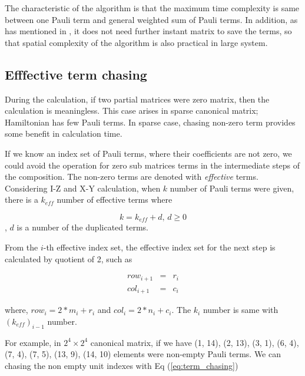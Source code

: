 \documentclass[twocolumn]{article}
\begin{document}
The characteristic of the algorithm is that 
the maximum time complexity is same between one Pauli term and general weighted sum of Pauli terms.
In addition, as has mentioned in \cite{Hantzko_2024}, it does not need further 
instant matrix to save the terms, so that spatial complexity of the algorithm is also practical 
in large system.

\subsection{Efffective term chasing}

During the calculation, if two partial matrices were zero matrix, then 
the calculation is meaningless. This case arises in sparse canonical matrix; 
Hamiltonian has few Pauli terms.
In sparse case, chasing non-zero term provides some benefit in calculation time.

If we know an index set of Pauli terms, where their coefficients are not zero,
we could avoid the operation for zero sub matrices terms in the intermediate steps of the composition.
The non-zero terms are denoted with \textit{effective} terms. 
Considering I-Z and X-Y calculation, when $k$ number of Pauli terms were given, 
there is a $k_{eff}$ number of effective terms where

\begin{equation}
    k = k_{eff} + d,\, d \geq 0
\end{equation}, $d$ is a number of the duplicated terms.

From the $i$-th effective index set, the effective index set for the next step is calculated by
quotient of 2, such as 

\begin{equation}
    \label{eq:term_chasing}
    \begin{array}{ccc}
        row_{i+1}&=& r_i \\
        col_{i+1}&=& c_i
    \end{array}
\end{equation}

where, $row_i = 2*m_i + r_i$ and $col_i = 2*n_i + c_i$.
The $k_i$ number is same with $(k_{eff})_{i-1}$ number. 

For example, in $2^4 \times 2^4$ canonical matrix, 
if we have 
(1, 14), 
(2, 13), 
(3, 1), 
(6, 4),
(7, 4),
(7, 5),
(13, 9),
(14, 10) elements 
were non-empty Pauli terms. 
We can chasing the non empty unit indexes with Eq (\ref{eq:term_chasing})
\end{document}
